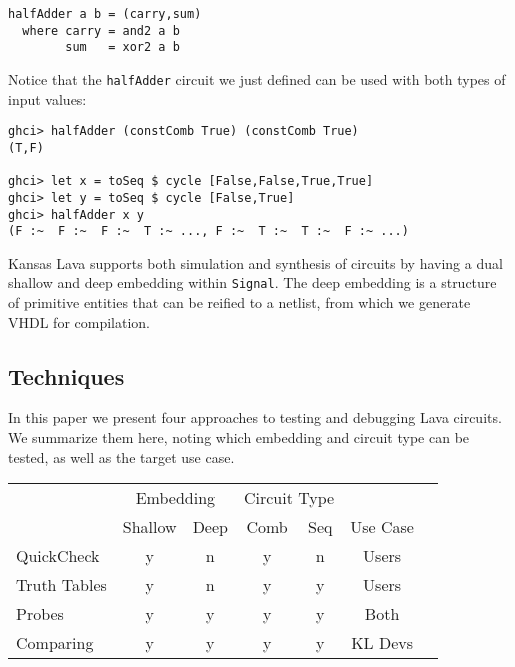 \documentclass{llncs}
\begin{document}
\begin{verbatim}
halfAdder a b = (carry,sum)
  where carry = and2 a b
        sum   = xor2 a b
\end{verbatim}

Notice that the \verb!halfAdder! circuit we just defined can be used with
both types of input values:

\begin{verbatim}
ghci> halfAdder (constComb True) (constComb True)                                            
(T,F)

ghci> let x = toSeq $ cycle [False,False,True,True]
ghci> let y = toSeq $ cycle [False,True]
ghci> halfAdder x y
(F :~  F :~  F :~  T :~ ..., F :~  T :~  T :~  F :~ ...)
\end{verbatim}

Kansas Lava supports both simulation and synthesis of circuits by having a dual
shallow and deep embedding within \verb!Signal!. The deep embedding is a
structure of primitive entities that can be reified to a netlist, from which
we generate VHDL for compilation.

\subsection{Techniques}

In this paper we present four approaches to testing and debugging
Lava circuits. We summarize them here, noting which embedding and
circuit type can be tested, as well as the target use case.

\begin{center}
\label{table:approaches}
\begin{tabular}{l | c | c | c | c | c | c |}
\cline{2-5}
& \multicolumn{2}{|c|}{Embedding}
& \multicolumn{2}{c|}{Circuit Type}
& \multicolumn{1}{|c}{}\\
\cline{2-6}
 & Shallow & Deep & Comb & Seq & Use Case \\
\hline
\multicolumn{1}{|l|}{QuickCheck} & y & n & y & n & Users \\
\hline
\multicolumn{1}{|l|}{Truth Tables} & y & n & y & y & Users \\
\hline
\multicolumn{1}{|l|}{Probes} & y & y & y & y & Both \\
\hline
\multicolumn{1}{|l|}{Comparing} & y & y & y & y & KL Devs \\
\hline
\end{tabular}


\end{center}
\end{document}
